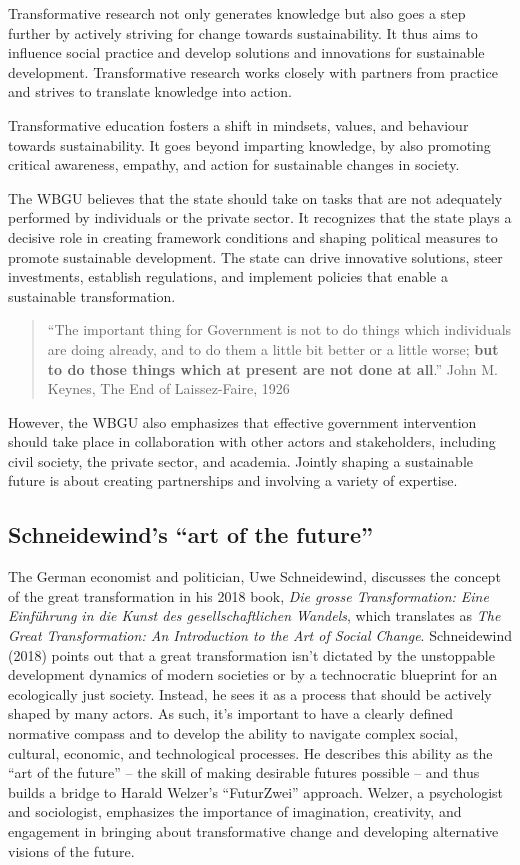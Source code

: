 \documentclass[
  a4paper,
  DIV=11,
  numbers=noendperiod,
  oneside,
  openany]{scrreprt}
\begin{document}
Transformative research not only generates knowledge but also goes a
step further by actively striving for change towards sustainability. It
thus aims to influence social practice and develop solutions and
innovations for sustainable development. Transformative research works
closely with partners from practice and strives to translate knowledge
into action.

Transformative education fosters a shift in mindsets, values, and
behaviour towards sustainability. It goes beyond imparting knowledge, by
also promoting critical awareness, empathy, and action for sustainable
changes in society.

The WBGU believes that the state should take on tasks that are not
adequately performed by individuals or the private sector. It recognizes
that the state plays a decisive role in creating framework conditions
and shaping political measures to promote sustainable development. The
state can drive innovative solutions, steer investments, establish
regulations, and implement policies that enable a sustainable
transformation.

\begin{quote}
``The important thing for Government is not to do things which
individuals are doing already, and to do them a little bit better or a
little worse; \textbf{but to do those things which at present are not
done at all}.'' John M. Keynes, The End of Laissez-Faire, 1926
\end{quote}

However, the WBGU also emphasizes that effective government intervention
should take place in collaboration with other actors and stakeholders,
including civil society, the private sector, and academia. Jointly
shaping a sustainable future is about creating partnerships and
involving a variety of expertise.

\subsection{Schneidewind's ``art of the
future''}\label{schneidewinds-art-of-the-future}

The German economist and politician, Uwe Schneidewind, discusses the
concept of the great transformation in his 2018 book, \emph{Die grosse
Transformation: Eine Einführung in die Kunst des gesellschaftlichen
Wandels}, which translates as \emph{The Great Transformation: An
Introduction to the Art of Social Change}. Schneidewind (2018) points
out that a great transformation isn't dictated by the unstoppable
development dynamics of modern societies or by a technocratic blueprint
for an ecologically just society. Instead, he sees it as a process that
should be actively shaped by many actors. As such, it's important to
have a clearly defined normative compass and to develop the ability to
navigate complex social, cultural, economic, and technological
processes. He describes this ability as the ``art of the future'' -- the
skill of making desirable futures possible -- and thus builds a bridge
to Harald Welzer's ``FuturZwei'' approach. Welzer, a psychologist and
sociologist, emphasizes the importance of imagination, creativity, and
engagement in bringing about transformative change and developing
alternative visions of the future.
\end{document}
